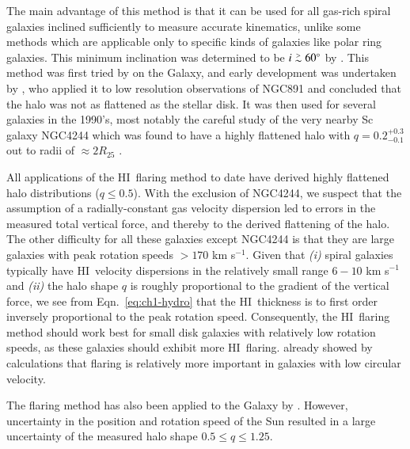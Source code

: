 \documentclass[traditabstract]{aa} %
\newcommand\gesim{\lower.5ex\hbox{$\; \buildrel > \over \sim \;$}}
\newcommand\HI{H{\small I}}
\newcommand\kms{km s$^{-1}$}
\begin{document}
The main advantage of this method is that it can be used for all
gas-rich spiral galaxies inclined sufficiently to measure accurate
kinematics, unlike some methods which are applicable only to specific 
kinds of galaxies like polar ring galaxies. 
This minimum inclination was determined to be 
$i \gesim 60^{\circ}$ by \citet{olling1995}.
This method was first tried by \citet{crb1979} on the Galaxy, 
and early development was undertaken by \citet{vdkruit1981}, who 
applied it to low resolution observations of NGC891 and
concluded that the halo was
not as flattened as the stellar disk. It was then used for several
galaxies in the 1990's, most notably the careful study of the very
nearby Sc galaxy NGC4244 which was found to have a highly flattened 
halo with 
$q=0.2^{+0.3}_{-0.1}$ out to radii of $\approx 2 R_{25}$
\citep{olling1996b}.

All applications of the \HI\ flaring method to date have derived
highly flattened halo distributions ($q \leq 0.5$). With the exclusion
of NGC4244, we suspect that the assumption of a radially-constant
gas velocity dispersion led to errors in the measured total vertical
force, and thereby to the derived flattening of
the halo. The other difficulty for all these galaxies except
NGC4244 is that they are large galaxies with peak rotation speeds
$>170$ \kms. Given that {\it (i)} spiral galaxies typically have
\HI\ velocity dispersions in the relatively small range $6-10$ \kms 
\citep{tamburro09}
and {\it (ii)} the halo shape $q$ is roughly proportional
to the gradient of the vertical force, we see from
Eqn.~\ref{eq:ch1-hydro} that the \HI\ thickness is to first order
inversely proportional to the peak rotation speed. Consequently, 
the \HI\ flaring
method should work best for small disk galaxies with relatively low
rotation speeds, as these galaxies should exhibit more \HI\ flaring.
\citet{bosma1994} already showed by
calculations that flaring is relatively more important in galaxies
with low circular velocity.

The flaring method has also been applied to the Galaxy by \citet{om2000}.
However, uncertainty in the position and rotation speed of the Sun
resulted in a large uncertainty of the measured halo shape $0.5
\leq q \leq 1.25$.
\end{document}
